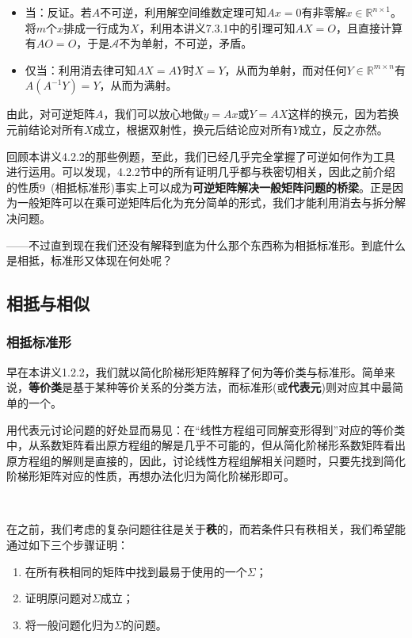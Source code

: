 \documentclass[a4paper,UTF8,fontset=windows]{ctexart}
\begin{document}
\begin{itemize}
    \item 当：反证。若$A$不可逆，利用解空间维数定理可知$Ax=0$有非零解$x\in\mathbb{R}^{n\times 1}$。将$m$个$x$排成一行成为$X$，利用本讲义7.3.1中的引理可知$AX=O$，且直接计算有$AO=O$，于是$\mathcal{A}$不为单射，不可逆，矛盾。
    
    \item 仅当：利用消去律可知$AX=AY$时$X=Y$，从而为单射，而对任何$Y\in\mathbb{R}^{m\times n}$有$A(A^{-1}Y)=Y$，从而为满射。
\end{itemize}

由此，对可逆矩阵$A$，我们可以放心地做$y=Ax$或$Y=AX$这样的换元，因为若换元前结论对所有$X$成立，根据双射性，换元后结论应对所有$Y$成立，反之亦然。

回顾本讲义4.2.2的那些例题，至此，我们已经几乎完全掌握了可逆如何作为工具进行运用。可以发现，4.2.2节中的所有证明几乎都与秩密切相关，因此之前介绍的性质9\ (相抵标准形)事实上可以成为\textbf{可逆矩阵解决一般矩阵问题的桥梁}。正是因为一般矩阵可以在乘可逆矩阵后化为充分简单的形式，我们才能利用消去与拆分解决问题。

——不过直到现在我们还没有解释到底为什么那个东西称为相抵标准形。到底什么是相抵，标准形又体现在何处呢？

\subsection{相抵与相似}
\subsubsection{相抵标准形}
早在本讲义1.2.2，我们就以简化阶梯形矩阵解释了何为等价类与标准形。简单来说，\textbf{等价类}是基于某种等价关系的分类方法，而标准形(或\textbf{代表元})则对应其中最简单的一个。

用代表元讨论问题的好处显而易见：在``线性方程组可同解变形得到''对应的等价类中，从系数矩阵看出原方程组的解是几乎不可能的，但从简化阶梯形系数矩阵看出原方程组的解则是直接的，因此，讨论线性方程组解相关问题时，只要先找到简化阶梯形矩阵对应的性质，再想办法化归为简化阶梯形即可。

\

在之前，我们考虑的复杂问题往往是关于\textbf{秩}的，而若条件只有秩相关，我们希望能通过如下三个步骤证明：
\begin{enumerate}
    \item 在所有秩相同的矩阵中找到最易于使用的一个$\Sigma$；
    \item 证明原问题对$\Sigma$成立；
    \item 将一般问题化归为$\Sigma$的问题。
\end{enumerate}
\end{document}
